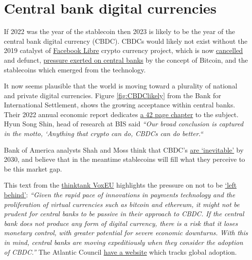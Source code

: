 \section{Central bank digital currencies}
If 2022 was the year of the stablecoin then 2023 is likely to be the year of the central bank digital currency (CBDC). CBDCs would likely not exist without the 2019 catalyst of \href{https://www.thetimes.co.uk/article/facebooks-libra-cryptocurrency-project-ends-in-failure-cxvnnc3kx}{Facebook Libre} crypto currency project, which is now \href{https://fortune.com/2022/07/01/meta-novi-crypto-payments-wallet-end-september-2022/}{cancelled} and defunct, \href{https://www.theguardian.com/world/2021/jul/09/currency-and-control-why-china-wants-to-undermine-bitcoin}{pressure exerted on central banks} by the concept of Bitcoin, and the stablecoins which emerged from the technology.\par
It now seems plausible that the world is moving toward a plurality of national and private digital currencies. Figure \ref{fig:CBDClikely} from the Bank for International Settlement, shows the growing acceptance within central banks. Their 2022 annual economic report dedicates \href{https://www.bis.org/publ/arpdf/ar2022e3.pdf}{a 42 page chapter} to the subject. Hyun Song Shin, head of research at BIS said \textit{``Our broad conclusion is captured in the motto, ‘Anything that crypto can do, CBDCs can do better.``}\par
Bank of America analysts Shah and Moss think that CBDC's \href{}{are `inevitable'} by 2030, and believe that in the meantime stablecoins will fill what they perceive to be this market gap.\par
This text from the \href{https://voxeu.org/article/benefits-central-bank-digital-currency}{thinktank VoxEU} highlights the pressure on not to be \href{https://himes.house.gov/u-s-central-bank-digital-currency}{`left behind'}: \textit{``Given the rapid pace of innovations in payments technology and the proliferation of virtual currencies such as bitcoin and ethereum, it might not be prudent for central banks to be passive in their approach to CBDC. If the central bank does not produce any form of digital currency, there is a risk that it loses monetary control, with greater potential for severe economic downturns. With this in mind, central banks are moving expeditiously when they consider the adoption of CBDC.''} The Atlantic Council \href{https://www.atlanticcouncil.org/cbdctracker/}{have a website} which tracks global adoption.\par\par

